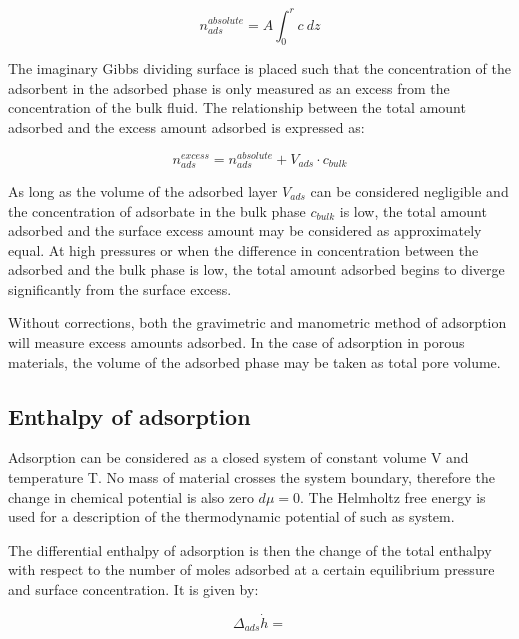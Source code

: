 \begin{equation}
  n_{ads}^{absolute} = A \int_0^r c\ dz
\end{equation}

The imaginary Gibbs dividing surface is placed such that the
concentration of the adsorbent in the adsorbed phase is only
measured as an excess from the concentration of the bulk fluid.
The relationship between the total amount adsorbed and the 
excess amount adsorbed is expressed as:

\begin{equation}
  n_{ads}^{excess} = n_{ads}^{absolute} + V_{ads} \cdot c_{bulk}
\end{equation}

As long as the volume of the adsorbed layer \(V_{ads}\) can be 
considered negligible and the concentration of adsorbate in the bulk 
phase \(c_{bulk}\) is low, the total amount adsorbed and the surface 
excess amount may be considered as approximately equal. 
At high pressures or when the difference in concentration between
the adsorbed and the bulk phase is low, the total amount adsorbed
begins to diverge significantly from the surface excess. 

Without corrections, both the gravimetric and manometric
method of adsorption will measure excess amounts adsorbed.
In the case of adsorption in porous materials, the volume of the
adsorbed phase may be taken as total pore volume. 

\subsection{Enthalpy of adsorption}

Adsorption can be considered as a closed system of constant volume
V and temperature T. No mass of material crosses the system boundary,
therefore the change in chemical potential is also
zero \(d\mu = 0\). The Helmholtz free energy is used for a description 
of the thermodynamic potential of such as system. 

The differential enthalpy of adsorption is then the change of the 
total enthalpy with respect to the number of moles adsorbed
at a certain equilibrium pressure and surface concentration.
It is given by:

\begin{equation}
  \Delta_{ads} \dot{h} = 
\end{equation}

